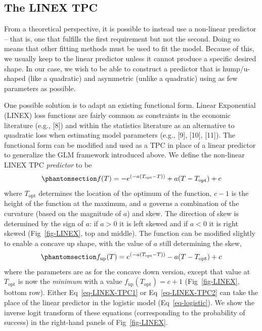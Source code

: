 \documentclass[
  11pt,
  letterpaper,
]{article}
\begin{document}
\subsection{The LINEX TPC}\label{the-linex-tpc}

From a theoretical perspective, it is possible to instead use a
non-linear predictor -- that is, one that fulfills the first requirement
but not the second. Doing so means that other fitting methods must be
used to fit the model. Because of this, we usually keep to the linear
predictor unless it cannot produce a specific desired shape. In our
case, we wish to be able to construct a predictor that is hump/u-shaped
(like a quadratic) and asymmetric (unlike a quadratic) using as few
parameters as possible.

One possible solution is to adapt an existing functional form. Linear
Exponential (LINEX) loss functions are fairly common as constraints in
the economic literature (e.g., {[}8{]}) and within the statistics
literature as an alternative to quadratic loss when estimating model
parameters (e.g., {[}9{]}, {[}10{]}, {[}11{]}). The functional form can
be modified and used as a TPC in place of a linear predictor to
generalize the GLM framework introduced above. We define the non-linear
LINEX TPC \emph{predictor} to be
\begin{equation}\phantomsection\label{eq-LINEX-TPC1}{
f(T) = - e^{(-a( T_{\mathrm{opt}} - T ) )} + a ( T - T_{\mathrm{opt}}) + c 
}\end{equation} where \(T_{\mathrm{opt}}\) determines the location of
the optimum of the function, \(c - 1\) is the height of the function at
the maximum, and \(a\) governs a combination of the curvature (based on
the magnitude of \(a\)) and skew. The direction of skew is determined by
the sign of \(a\): if \(a>0\) it is left skewed and if \(a<0\) it is
right skewed (Fig~\ref{fig-LINEX}, top and middle). The function can be
modified slightly to enable a concave up shape, with the value of \(a\)
still determining the skew,
\begin{equation}\phantomsection\label{eq-LINEX-TPC2}{
f_{\mathrm{up}}(T) = e^{(-a( T_{\mathrm{opt}} - T ) )} - a ( T - T_{\mathrm{opt}}) + c  
}\end{equation} where the parameters are as for the concave down
version, except that value at \(T_{\mathrm{opt}}\) is now the
\emph{minimum} with a value \(f_{\mathrm{up}}(T_{\mathrm{opt}}) = c+1\)
(Fig~\ref{fig-LINEX}, bottom row). Either Eq~\ref{eq-LINEX-TPC1} or
Eq~\ref{eq-LINEX-TPC2} can take the place of the linear predictor in the
logistic model (Eq~\ref{eq-logistic}). We show the inverse logit
transform of these equations (corresponding to the probability of
success) in the right-hand panels of Fig~\ref{fig-LINEX}.
\end{document}
